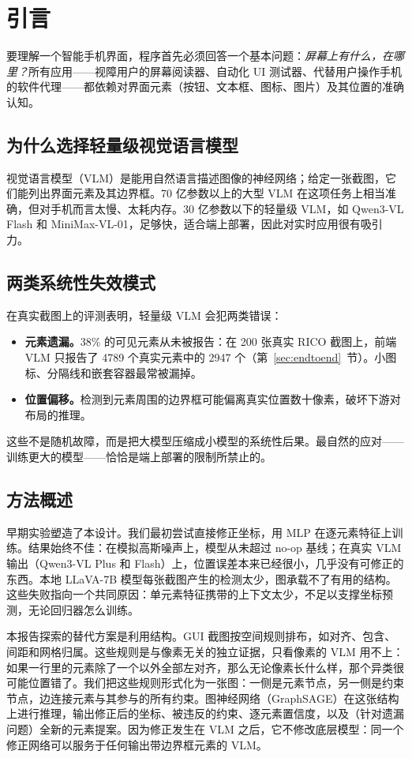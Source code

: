 \documentclass[11pt, letterpaper]{ctexart}
\begin{document}
\section{引言}
要理解一个智能手机界面，程序首先必须回答一个基本问题：\emph{屏幕上有什么，在哪里？}所有应用——视障用户的屏幕阅读器、自动化 UI 测试器、代替用户操作手机的软件代理——都依赖对界面元素（按钮、文本框、图标、图片）及其位置的准确认知。

\subsection{为什么选择轻量级视觉语言模型}
视觉语言模型（VLM）是能用自然语言描述图像的神经网络；给定一张截图，它们能列出界面元素及其边界框。70 亿参数以上的大型 VLM 在这项任务上相当准确，但对手机而言太慢、太耗内存。30 亿参数以下的轻量级 VLM，如 Qwen3-VL Flash \cite{bai2023qwen} 和 MiniMax-VL-01，足够快，适合端上部署，因此对实时应用很有吸引力。

\subsection{两类系统性失效模式}
在真实截图上的评测表明，轻量级 VLM 会犯两类错误：

\begin{itemize}
\item \textbf{元素遗漏。}38\% 的可见元素从未被报告：在 200 张真实 RICO 截图上，前端 VLM 只报告了 4789 个真实元素中的 2947 个（第~\ref{sec:endtoend}~节）。小图标、分隔线和嵌套容器最常被漏掉。
\item \textbf{位置偏移。}检测到元素周围的边界框可能偏离真实位置数十像素，破坏下游对布局的推理。
\end{itemize}

这些不是随机故障，而是把大模型压缩成小模型的系统性后果。最自然的应对——训练更大的模型——恰恰是端上部署的限制所禁止的。

\subsection{方法概述}
早期实验塑造了本设计。我们最初尝试直接修正坐标，用 MLP 在逐元素特征上训练。结果始终不佳：在模拟高斯噪声上，模型从未超过 no-op 基线；在真实 VLM 输出（Qwen3-VL Plus 和 Flash）上，位置误差本来已经很小，几乎没有可修正的东西。本地 LLaVA-7B 模型每张截图产生的检测太少，图承载不了有用的结构。这些失败指向一个共同原因：单元素特征携带的上下文太少，不足以支撑坐标预测，无论回归器怎么训练。

本报告探索的替代方案是利用结构。GUI 截图按空间规则排布，如对齐、包含、间距和网格归属。这些规则是与像素无关的独立证据，只看像素的 VLM 用不上：如果一行里的元素除了一个以外全部左对齐，那么无论像素长什么样，那个异类很可能位置错了。我们把这些规则形式化为一张图：一侧是元素节点，另一侧是约束节点，边连接元素与其参与的所有约束。图神经网络（GraphSAGE）在这张结构上进行推理，输出修正后的坐标、被违反的约束、逐元素置信度，以及（针对遗漏问题）全新的元素提案。因为修正发生在 VLM 之后，它不修改底层模型：同一个修正网络可以服务于任何输出带边界框元素的 VLM。
\end{document}
